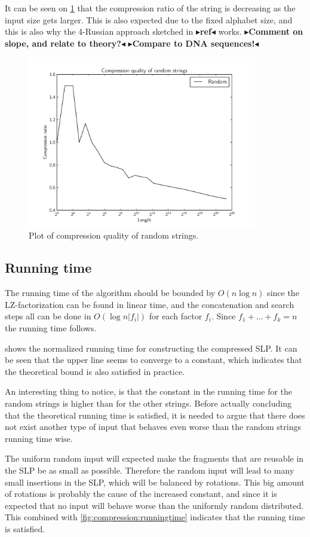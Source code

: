 \documentclass[twoside,11pt,openright]{report}
\newcommand{\todo}[1]{{\color[rgb]{.5,0,0}\textbf{$\blacktriangleright$#1$\blacktriangleleft$}}}
\begin{document}
It can be seen on \cref{fig:compression:quality:random} that the compression ratio of the string is decreasing as the input size gets larger. This is also expected due to the fixed alphabet size, and this is also why the 4-Russian approach sketched in \todo{ref} works.
\todo{Comment on slope, and relate to theory?}
\todo{Compare to DNA sequences!}
%
\begin{figure}[h!]
  \centering
  \includegraphics[width=10cm]{compression/random}
  \caption{Plot of compression quality of random strings.}
  \label{fig:compression:quality:random}
\end{figure}

\subsection{Running time}
The running time of the algorithm should be bounded by $O(n\log{n})$ since the LZ-factorization can be found in linear time, and the concatenation and search steps all can be done in $O(\log{n} |f_i|)$ for each factor $f_i$. Since $f_1 + \dots + f_k = n$ the running time follows.

 shows the normalized running time for constructing the compressed SLP. It can be seen that the upper line seems to converge to a constant, which indicates that the theoretical bound is also satisfied in practice.

An interesting thing to notice, is that the constant in the running time for the random strings is higher than for the other strings. Before actually concluding that the theoretical running time is satisfied, it is needed to argue that there does not exist another type of input that behaves even worse than the random strings running time wise.

The uniform random input will expected make the fragments that are reusable in the SLP be as small as possible. Therefore the random input will lead to many small insertions in the SLP, which will be balanced by rotations. This big amount of rotations is probably the cause of the increased constant, and since it is expected that no input will behave worse than the uniformly random distributed. This combined with \cref{fig:compression:runningtime} indicates that the running time is satisfied.
\end{document}
